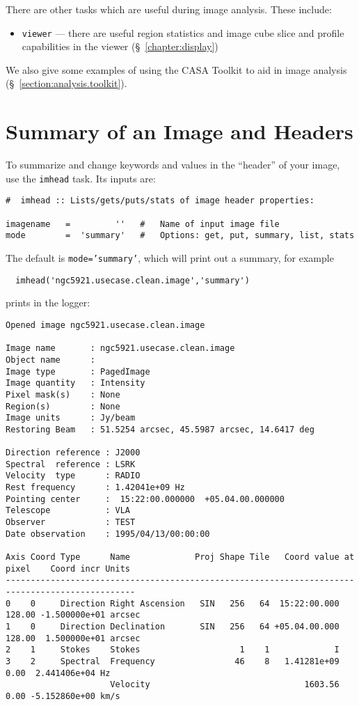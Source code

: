 There are other tasks which are useful during image analysis.  These
include:
\begin{itemize}
   \item {\tt viewer} --- there are useful region statistics and
         image cube slice and profile capabilities in the viewer 
         (\S~\ref{chapter:display})
\end{itemize}

We also give some examples of using the CASA Toolkit to aid in
image analysis (\S~\ref{section:analysis.toolkit}).

\section{Summary of an Image and Headers}
\label{section:analysis.imhead}

To summarize and change keywords and values in the ``header'' of
your image, use the {\tt imhead} task.  Its inputs are:
\small
\begin{verbatim}
#  imhead :: Lists/gets/puts/stats of image header properties:

imagename   =         ''   #   Name of input image file
mode        =  'summary'   #   Options: get, put, summary, list, stats
\end{verbatim}
\normalsize

The default is {\tt mode='summary'}, which will print out a summary,
for example
\small
\begin{verbatim}
  imhead('ngc5921.usecase.clean.image','summary')
\end{verbatim}
\normalsize
prints in the logger: 
\small
\begin{verbatim}
Opened image ngc5921.usecase.clean.image

Image name       : ngc5921.usecase.clean.image
Object name      : 
Image type       : PagedImage
Image quantity   : Intensity
Pixel mask(s)    : None
Region(s)        : None
Image units      : Jy/beam
Restoring Beam   : 51.5254 arcsec, 45.5987 arcsec, 14.6417 deg

Direction reference : J2000
Spectral  reference : LSRK
Velocity  type      : RADIO
Rest frequency      : 1.42041e+09 Hz
Pointing center     :  15:22:00.000000  +05.04.00.000000
Telescope           : VLA
Observer            : TEST
Date observation    : 1995/04/13/00:00:00

Axis Coord Type      Name             Proj Shape Tile   Coord value at pixel    Coord incr Units
------------------------------------------------------------------------------------------------ 
0    0     Direction Right Ascension   SIN   256   64  15:22:00.000   128.00 -1.500000e+01 arcsec
1    0     Direction Declination       SIN   256   64 +05.04.00.000   128.00  1.500000e+01 arcsec
2    1     Stokes    Stokes                    1    1             I
3    2     Spectral  Frequency                46    8   1.41281e+09     0.00  2.441406e+04 Hz
                     Velocity                               1603.56     0.00 -5.152860e+00 km/s
\end{verbatim}
\normalsize

